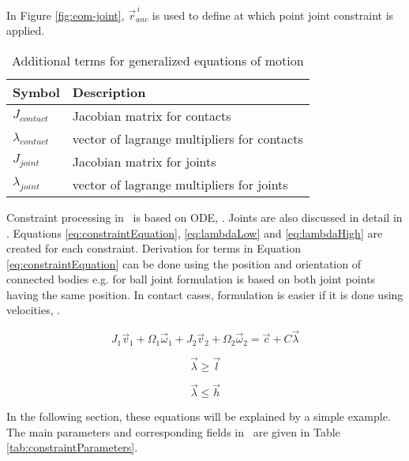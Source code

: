 In Figure \ref{fig:eom-joint}, $\vec{r}_{anc}^{\,i}$ is used to define at which point
joint constraint is applied.

\begin{table}
\caption {Additional terms  for generalized equations of motion}
\label{tab:eom-g}
\begin{center}
\begin{tabular}{|l| l|}
\hline
{\bf Symbol} & {\bf Description} \\  \hline
$J_{contact}$ & Jacobian matrix for contacts  \\ \hline
$\lambda_{contact}$ & vector of lagrange multipliers for contacts  \\ \hline
$J_{joint}$ & Jacobian matrix for joints  \\ \hline
$\lambda_{joint}$ & vector of lagrange multipliers for joints  \\ \hline
\end {tabular}
\end{center}
\end {table}

Constraint processing in \bullet\ is based on ODE, \cite{ode}.
Joints are also discussed in detail in  
\cite{erleben.thesis}.
Equations \ref{eq:constraintEquation}, \ref{eq:lambdaLow} and
\ref{eq:lambdaHigh} 
are created for each constraint. 
Derivation for terms in Equation \ref{eq:constraintEquation}
can be done using the position and orientation of connected bodies
e.g. for ball joint formulation is based on both joint points having the same position.
In contact cases, formulation is easier if it is done using velocities, \cite{ode.joints}.

\begin{equation} \label{eq:constraintEquation}
J_1 \vec{v}_1 + \Omega_1 \vec{\omega}_1 + 
J_2 \vec{v}_2 + \Omega_2 \vec{\omega}_2 = \vec{c} + C \vec{\lambda}
\end{equation}

\begin{equation} \label{eq:lambdaLow}
\vec{\lambda} \geq \vec{l}
\end{equation}

\begin{equation} \label{eq:lambdaHigh}
\vec{\lambda} \leq \vec{h}
\end{equation}

In the following section, these equations will be explained by a simple example.
The main parameters  and corresponding fields in \bullet\  
are given in Table \ref{tab:constraintParameters}.

